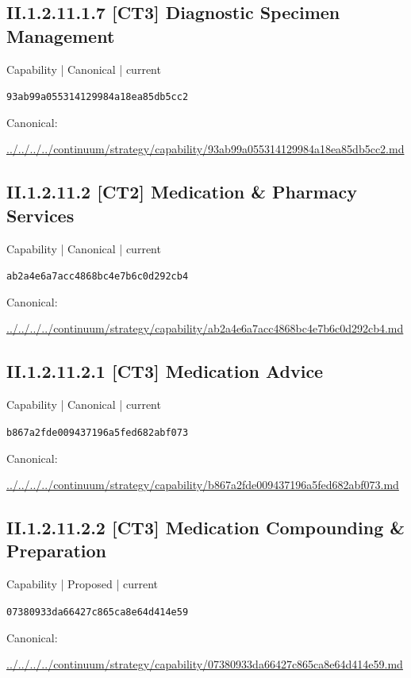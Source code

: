 \documentclass[10pt,a4paper]{article}
\begin{document}
\subsection*{II.1.2.11.1.7 [CT3] Diagnostic Specimen Management}
{\small Capability | Canonical | current}\par
\texttt{93ab99a055314129984a18ea85db5cc2}\par
Canonical: \par
{\footnotesize\url{../../../../continuum/strategy/capability/93ab99a055314129984a18ea85db5cc2.md}}\par
\subsection*{II.1.2.11.2 [CT2] Medication \& Pharmacy Services}
{\small Capability | Canonical | current}\par
\texttt{ab2a4e6a7acc4868bc4e7b6c0d292cb4}\par
Canonical: \par
{\footnotesize\url{../../../../continuum/strategy/capability/ab2a4e6a7acc4868bc4e7b6c0d292cb4.md}}\par
\subsection*{II.1.2.11.2.1 [CT3] Medication Advice}
{\small Capability | Canonical | current}\par
\texttt{b867a2fde009437196a5fed682abf073}\par
Canonical: \par
{\footnotesize\url{../../../../continuum/strategy/capability/b867a2fde009437196a5fed682abf073.md}}\par
\subsection*{II.1.2.11.2.2 [CT3] Medication Compounding \& Preparation}
{\small Capability | Proposed | current}\par
\texttt{07380933da66427c865ca8e64d414e59}\par
Canonical: \par
{\footnotesize\url{../../../../continuum/strategy/capability/07380933da66427c865ca8e64d414e59.md}}\par
\end{document}

